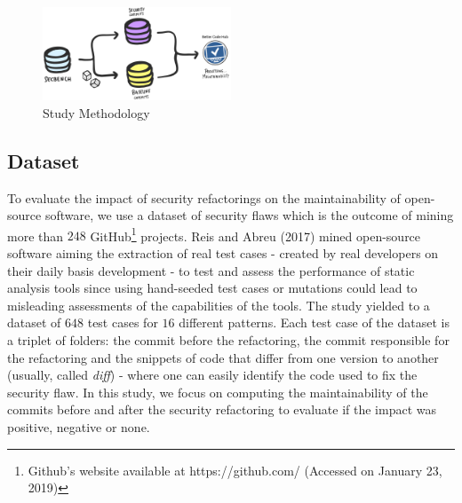 \documentclass[10pt,conference]{IEEEtran}
\begin{document}
\begin{figure}[h]
 	\centering
 	\includegraphics[width=0.5\textwidth]{figures/methodology.pdf}
 	\caption{Study Methodology}
	\label{fig:met}
\end{figure}

\subsection{Dataset}

To evaluate the impact of security refactorings on the maintainability of open-source software, we use a dataset of security flaws which is the outcome of mining more than $248$ GitHub\footnote{Github's website available at https://github.com/ (Accessed on January 23, 2019)} projects. Reis and Abreu (2017) mined open-source software aiming the extraction of real test cases - created by real developers on their daily basis development - to test and assess the performance of static analysis tools since using hand-seeded test cases or mutations could lead to misleading assessments of the capabilities of the tools. The study yielded to a dataset of $648$ test cases for $16$ different patterns. Each test case of the dataset is a triplet of folders: the commit before the refactoring, the commit responsible for the refactoring and the snippets of code that differ from one version to another (usually, called \textit{diff}) - where one can easily identify the code used to fix the security flaw. In this study, we focus on computing the maintainability of the commits before and after the security refactoring to evaluate if the impact was positive, negative or none.
\end{document}
